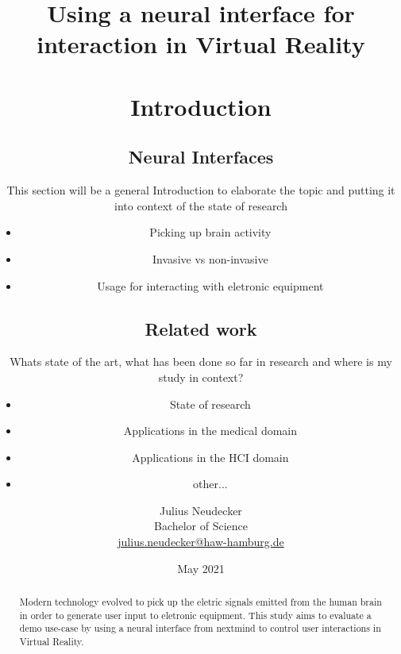 \documentclass[titlepage, a4paper, 11pt]{scrartcl}
\begin{document}
    \title{{Using a neural interface for interaction in Virtual Reality}
    \author{Julius Neudecker \\ Bachelor of Science \\ \href{mailto:julius.neudecker@haw-hamburg.de}{julius.neudecker@haw-hamburg.de} }
    \date{May 2021}

    \maketitle

    \tableofcontents

    \begin{abstract}
        Modern technology evolved to pick up the eletric signals emitted from the human brain in order to generate user input to eletronic equipment. This study aims to evaluate a demo use-case by using a neural interface from nextmind to control user interactions in Virtual Reality.
    \end{abstract}

    \section{Introduction}

        \subsection{Neural Interfaces}

            This section will be a general Introduction to elaborate the topic and putting it into context of the state of research

            \begin{itemize}
                \item Picking up brain activity
                \item Invasive vs non-invasive
                \item Usage for interacting with eletronic equipment
            \end{itemize}

        \subsection{Related work}

            Whats state of the art, what has been done so far in research and where is my study in context?

            \begin{itemize}
                \item State of research
                \item Applications in the medical domain
                \item Applications in the HCI domain
                \item other...
            \end{itemize}

}
\end{document}

